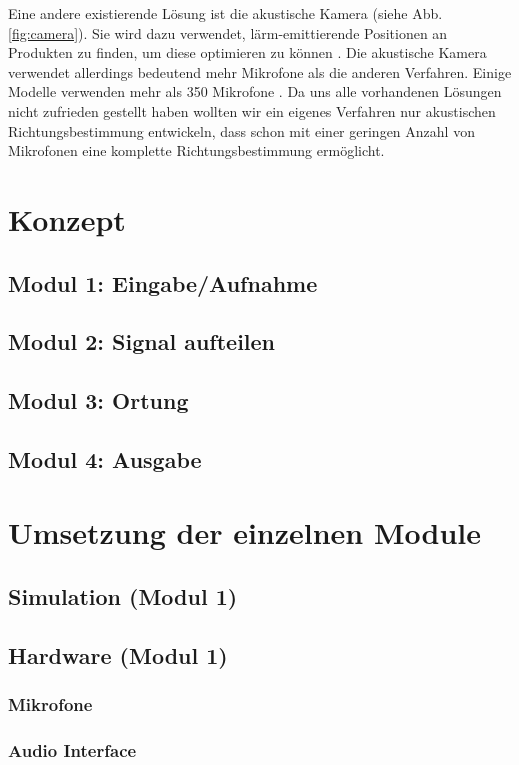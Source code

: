 \documentclass[10pt,a4paper]{article}
\begin{document}
  Eine andere existierende Lösung ist die akustische Kamera (siehe Abb. \ref{fig:camera}). Sie wird dazu verwendet, lärm-emittierende Positionen an Produkten zu finden, um diese optimieren zu können \cite{camera}. Die akustische Kamera verwendet allerdings bedeutend mehr Mikrofone als die anderen Verfahren. Einige Modelle verwenden mehr als 350 Mikrofone \cite{nmics}. Da uns alle vorhandenen Lösungen nicht zufrieden gestellt haben wollten wir ein eigenes Verfahren nur akustischen Richtungsbestimmung entwickeln, dass schon mit einer geringen Anzahl von Mikrofonen eine komplette Richtungsbestimmung ermöglicht.
  \section{Konzept} 
      \subsection{Modul 1: Eingabe/Aufnahme}
      \subsection{Modul 2: Signal aufteilen}
      \subsection{Modul 3: Ortung}
      \subsection{Modul 4: Ausgabe}
  \section{Umsetzung der einzelnen Module} 
      \subsection{Simulation (Modul 1)}
      \subsection{Hardware (Modul 1)}
      \subsubsection{Mikrofone}
      \subsubsection{Audio Interface}
\end{document}
